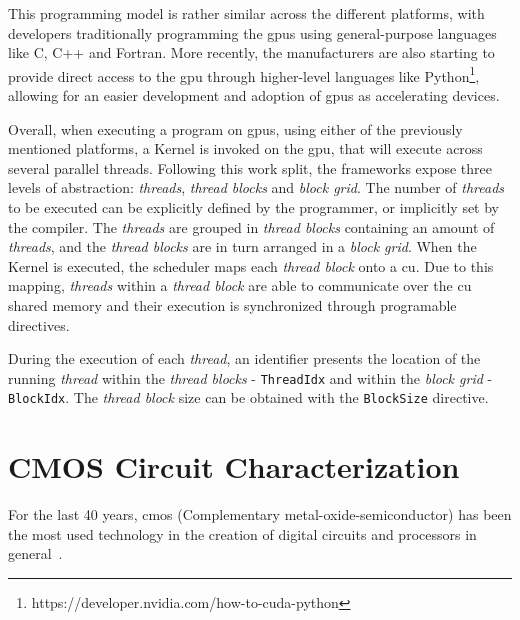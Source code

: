 This programming model is rather similar across the different platforms, with developers traditionally programming the \acrshort{gpu}s using general-purpose languages like C, C++ and Fortran. More recently, the manufacturers are also starting to provide direct access to the \acrshort{gpu} through higher-level languages like Python\footnote{https://developer.nvidia.com/how-to-cuda-python}, allowing for an easier development and adoption of \acrshort{gpu}s as accelerating devices.

Overall, when executing a program on \acrshort{gpu}s, using either of the previously mentioned platforms, a Kernel is invoked on the \acrshort{gpu}, that will execute across several parallel threads. Following this work split, the frameworks expose three levels of abstraction: \textit{threads}, \textit{thread blocks} and  \textit{block grid}. The number of \textit{threads} to be executed can be explicitly defined by the programmer, or implicitly set by the compiler. The \textit{threads} are grouped in \textit{thread blocks} containing an amount of \textit{threads}, and the \textit{thread blocks} are in turn arranged in a \textit{block grid}. When the Kernel is executed, the scheduler maps each \textit{thread block} onto a \acrshort{cu}. Due to this mapping, \textit{threads} within a \textit{thread block} are able to communicate over the \acrshort{cu} shared memory and their execution is synchronized through programable directives.

During the execution of each \textit{thread}, an identifier presents the location of the running \textit{thread} within the \textit{thread blocks} - \texttt{ThreadIdx} and within the \textit{block grid} - \texttt{BlockIdx}. The \textit{thread block} size can be obtained with the \texttt{BlockSize} directive. 

\section{CMOS Circuit Characterization}
\label{section:CMOS}

For the last 40 years, \acrshort{cmos} (Complementary metal-oxide-semiconductor) has been the most used technology in the creation of digital circuits and processors in general~\cite{zhang_metal_2003}. 

